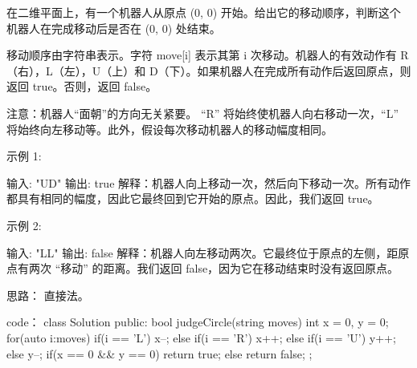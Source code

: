 在二维平面上，有一个机器人从原点 (0, 0) 开始。给出它的移动顺序，判断这个机器人在完成移动后是否在 (0, 0) 处结束。

移动顺序由字符串表示。字符 move[i] 表示其第 i 次移动。机器人的有效动作有 R（右），L（左），U（上）和 D（下）。如果机器人在完成所有动作后返回原点，则返回 true。否则，返回 false。

注意：机器人“面朝”的方向无关紧要。 “R” 将始终使机器人向右移动一次，“L” 将始终向左移动等。此外，假设每次移动机器人的移动幅度相同。

 

示例 1:

输入: "UD"
输出: true
解释：机器人向上移动一次，然后向下移动一次。所有动作都具有相同的幅度，因此它最终回到它开始的原点。因此，我们返回 true。

示例 2:

输入: "LL"
输出: false
解释：机器人向左移动两次。它最终位于原点的左侧，距原点有两次 “移动” 的距离。我们返回 false，因为它在移动结束时没有返回原点。






















思路：
直接法。





























code：
class Solution {
public:
    bool judgeCircle(string moves) {
        int x = 0, y = 0;
        for(auto i:moves)
        {
            if(i == 'L') x--;
            else if(i == 'R') x++;
            else if(i == 'U') y++;
            else y--;
        }
        if(x == 0 && y == 0) return true;
        else return false;
    }
};